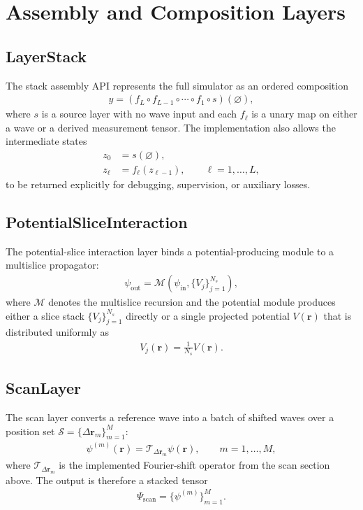 \documentclass[11pt]{article}
\begin{document}
\section{Assembly and Composition Layers}
\subsection{LayerStack}
The stack assembly API represents the full simulator as an ordered composition
\begin{align}
  y = (f_L \circ f_{L-1} \circ \cdots \circ f_1 \circ s)(\varnothing),
\end{align}
where $s$ is a source layer with no wave input and each $f_\ell$ is a unary map on
either a wave or a derived measurement tensor.  The implementation also allows the
intermediate states
\begin{align}
  z_0 &= s(\varnothing), \\
  z_\ell &= f_\ell(z_{\ell-1}), \qquad \ell=1,\dots,L,
\end{align}
to be returned explicitly for debugging, supervision, or auxiliary losses.

\subsection{PotentialSliceInteraction}
The potential-slice interaction layer binds a potential-producing module to a
multislice propagator:
\begin{align}
  \psi_{\mathrm{out}}
  = \mathcal{M}\!\left(
    \psi_{\mathrm{in}},
    \{V_j\}_{j=1}^{N_s}
  \right),
\end{align}
where $\mathcal{M}$ denotes the multislice recursion and the potential module produces
either a slice stack $\{V_j\}_{j=1}^{N_s}$ directly or a single projected potential
$V(\mathbf{r})$ that is distributed uniformly as
\begin{align}
  V_j(\mathbf{r}) = \frac{1}{N_s}V(\mathbf{r}).
\end{align}

\subsection{ScanLayer}
The scan layer converts a reference wave into a batch of shifted waves over a position
set $\mathcal{S} = \{\Delta \mathbf{r}_m\}_{m=1}^{M}$:
\begin{align}
  \psi^{(m)}(\mathbf{r})
  = \mathcal{T}_{\Delta \mathbf{r}_m}\psi(\mathbf{r}),
  \qquad m=1,\dots,M,
\end{align}
where $\mathcal{T}_{\Delta \mathbf{r}_m}$ is the implemented Fourier-shift operator
from the scan section above.  The output is therefore a stacked tensor
\begin{align}
  \Psi_{\mathrm{scan}}
  = \{\psi^{(m)}\}_{m=1}^{M}.
\end{align}
\end{document}
